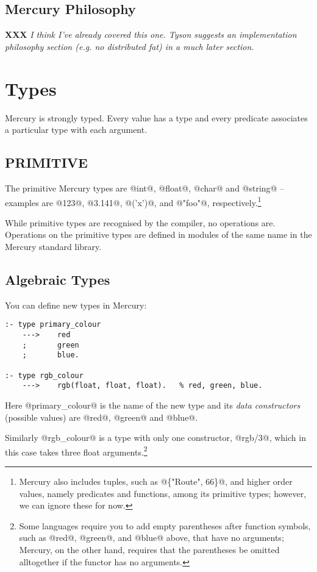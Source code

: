 \documentclass[a4paper,11pt,notitlepage,onecolumn]{article}
\newcommand{\XXX}[1]%
{{\small\textbf{XXX} \emph{#1}}}
\begin{document}
\subsection{Mercury Philosophy}

\XXX{I think I've already covered this one.  Tyson suggests an
implementation philosophy section (e.g. no distributed fat) in
a much later section.}



\section{Types}

Mercury is strongly typed.  Every value has a type and every
predicate associates a particular type with each argument.

\subsection{PRIMITIVE}

The primitive Mercury types are @int@, @float@, @char@ and @string@ --
examples are @123@, @3.141@, @('x')@, and @"foo"@, respectively.\footnote{Mercury also includes tuples, such as @\{"Route", 66\}@,
and higher order values, namely predicates and functions, among
its primitive types; however, we can ignore these for now.}

While primitive types are recognised by the compiler, no
operations are.  Operations on the primitive types are defined in
modules of the same name in the Mercury standard library.

\subsection{Algebraic Types}

You can define new types in Mercury:
\begin{verbatim}
:- type primary_colour
    --->    red
    ;       green
    ;       blue.

:- type rgb_colour
    --->    rgb(float, float, float).   % red, green, blue.
\end{verbatim}

Here @primary_colour@ is the name of the new type and its
\emph{data constructors} (possible values) are @red@, @green@ and @blue@.

Similarly @rgb_colour@ is a type with only one constructor,
@rgb/3@, which in this case takes three float arguments.\footnote{Some languages require you to add empty parentheses
after function symbols, such as @red@, @green@, and @blue@ above,
that have no arguments; Mercury, on the other hand, requires
that the parentheses be omitted alltogether if the functor has
no arguments.}
\end{document}
